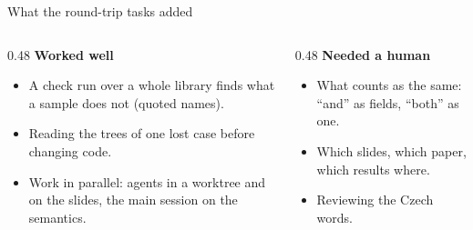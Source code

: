 \documentclass[10pt,aspectratio=169]{beamer}
\newcommand{\bad}[1]{\textcolor{warn}{#1}}
\newcommand{\ok}[1]{\textcolor{good}{#1}}
\begin{document}
\begin{frame}{What the round-trip tasks added}
  \begin{columns}[T]
    \begin{column}{0.48\textwidth}
      \ok{\textbf{Worked well}}
      \begin{itemize}\small
        \item A check run over a whole library finds what a sample does not (quoted names).
        \item Reading the trees of one lost case before changing code.
        \item Work in parallel: agents in a worktree and on the slides, the main session on the
              semantics.
      \end{itemize}
    \end{column}
    \begin{column}{0.48\textwidth}
      \bad{\textbf{Needed a human}}
      \begin{itemize}\small
        \item What counts as the same: ``and'' as fields, ``both'' as one.
        \item Which slides, which paper, which results where.
        \item Reviewing the Czech words.
      \end{itemize}
    \end{column}
  \end{columns}
\end{frame}
\end{document}
